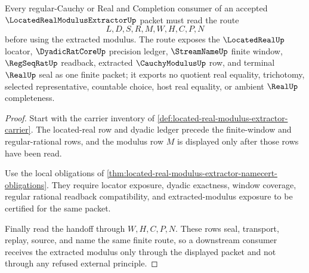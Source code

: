 \begin{theorem}
\label{thm:located-real-modulus-extractor-readback-route}
Every regular-Cauchy or Real and Completion consumer of an accepted $\LocatedRealModulusExtractorUp$ packet must read the route
$$
L,D,S,R,M,W,H,C,P,N
$$
before using the extracted modulus. The route exposes the $\LocatedRealUp$ locator, $\DyadicRatCoreUp$ precision ledger, $\StreamNameUp$ finite window, $\RegSeqRatUp$ readback, extracted $\CauchyModulusUp$ row, and terminal $\RealUp$ seal as one finite packet; it exports no quotient real equality, trichotomy, selected representative, countable choice, host real equality, or ambient $\RealUp$ completeness.
\end{theorem}
\begin{proof}
Start with the carrier inventory of \autoref{def:located-real-modulus-extractor-carrier}. The located-real row and dyadic ledger precede the finite-window and regular-rational rows, and the modulus row $M$ is displayed only after those rows have been read.

Use the local obligations of \autoref{thm:located-real-modulus-extractor-namecert-obligations}. They require locator exposure, dyadic exactness, window coverage, regular rational readback compatibility, and extracted-modulus exposure to be certified for the same packet.

Finally read the handoff through $W,H,C,P,N$. These rows seal, transport, replay, source, and name the same finite route, so a downstream consumer receives the extracted modulus only through the displayed packet and not through any refused external principle.
\end{proof}




